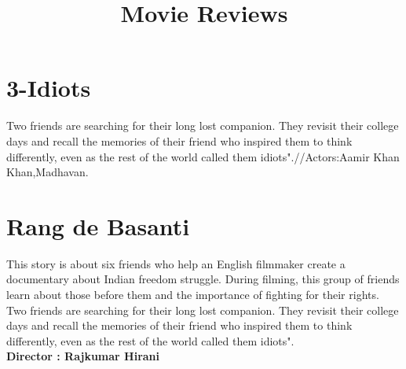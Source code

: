 \documentclass{article}
\title{Movie Reviews}
\begin{document}
	\maketitle
	\section{3-Idiots}
	\large{Two friends are searching for their long lost companion. They revisit their college days and recall the memories of their friend who inspired them to think differently, even as the rest of the world called them idiots".//Actors:Aamir Khan Khan,Madhavan.}
	\section{Rang de Basanti}
	\large{This story is about six friends who help an English filmmaker create a documentary about Indian freedom struggle. During filming, this group of friends learn about those before them and the importance of fighting for their rights.}
	\large{Two friends are searching for their long lost companion. They revisit their college days and recall the memories of their friend who inspired them to think differently, even as the rest of the world called them idiots".}
\\
\textbf{Director : Rajkumar Hirani}
\\
\end{document}
